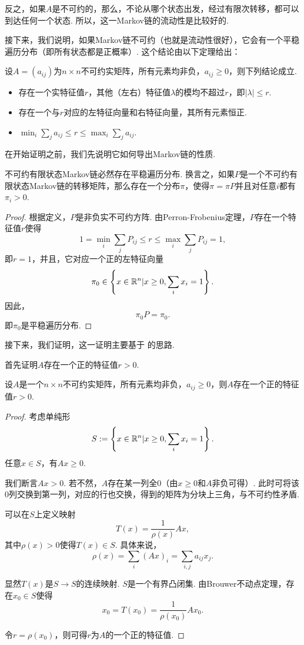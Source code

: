 反之，如果$A$是不可约的，那么，不论从哪个状态出发，经过有限次转移，都可以到达任何一个状态. 所以，这一Markov链的流动性是比较好的.

接下来，我们说明，如果Markov链不可约（也就是流动性很好），它会有一个平稳遍历分布（即所有状态都是正概率）. 这个结论由以下定理给出：

\begin{theorem}\label{thm:perron-frobenius}
    设$A=(a_{ij})$为$n\times n$不可约实矩阵，所有元素均非负，$a_{ij}\geq 0$，则下列结论成立.
    \begin{itemize}
        \item 存在一个实特征值$r$，其他（左右）特征值$\lambda$的模均不超过$r$，即$|\lambda|\leq r$.
        \item 存在一个与$r$对应的左特征向量和右特征向量，其所有元素恒正.
        \item $\min_i\sum_{j}a_{ij}\leq r\leq \max_i\sum_j a_{ij}$.
    \end{itemize}
\end{theorem}

在开始证明之前，我们先说明它如何导出Markov链的性质. 

\begin{corollary}
    不可约有限状态Markov链必然存在平稳遍历分布. 换言之，如果$P$是一个不可约有限状态Markov链的转移矩阵，那么存在一个分布$\pi$，使得$\pi=\pi P$并且对任意$i$都有$\pi_{i}>0$.
\end{corollary}
\begin{proof}
    根据定义，$P$是非负实不可约方阵. 由Perron-Frobenius定理，$P$存在一个特征值$r$使得
    \[1=\min_i\sum_jP_{ij}\leq r\le\max_i\sum_j P_{ij}=1,\]
    即$r=1$，并且，它对应一个正的左特征向量
    \[\pi_0\in \left\{x\in\mathbb{R}^n|x\geq 0,\sum_ix_i=1\right\}.\]
    因此，
    \[\pi_0 P = \pi_0.\]
    即$\pi_0$是平稳遍历分布. 
\end{proof}

接下来，我们证明，这一证明主要基于 \cite{debreuNonnegativeSquareMatrices1953} 的思路. 

首先证明$A$存在一个正的特征值$r>0$.

\begin{lemma}\label{lemma:positive-eigenvalue}
    设$A$是一个$n\times n$不可约实矩阵，所有元素均非负，$a_{ij}\geq 0$，则$A$存在一个正的特征值$r>0$.
\end{lemma}
\begin{proof}
考虑单纯形
\[S:=\left\{x\in\mathbb{R}^n|x\geq 0,\sum_i x_i=1\right\}.\]
任意$x\in S$，有$Ax\geq 0$. 

我们断言$Ax>0$. 若不然，$A$存在某一列全$0$（由$x\geq 0$和$A$非负可得）. 此时可将该$0$列交换到第一列，对应的行也交换，得到的矩阵为分块上三角，与不可约性矛盾.

可以在$S$上定义映射
\[T(x) = \frac1{\rho(x)}Ax,\]
其中$\rho(x) > 0$使得$T(x)\in S$. 具体来说，
\[\rho(x) = \sum_i (Ax)_i = \sum_{i,j} a_{ij}x_j.\]

显然$T(x)$是$S\to S$的连续映射. $S$是一个有界凸闭集. 由Brouwer不动点定理，存在$x_0\in S$使得
\[x_0 = T(x_0)=\frac1{\rho(x_0)}Ax_0.\]

令$r=\rho(x_0)$，则可得$r$为$A$的一个正的特征值.
\end{proof}

